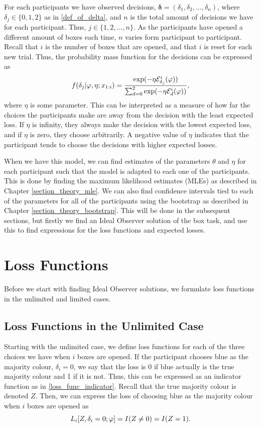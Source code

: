 For each participants we have observed decisions, $\boldsymbol{\delta}=(\delta_1,\delta_2,...,\delta_n)$, where $\delta_j \in \{0,1,2 \}$ as in \eqref{def_of_delta}, and $n$ is the total amount of decisions we have for each participant. Thus, $j\in \{1,2,...,n \}$. As the participants have opened a different amount of boxes each time, $n$ varies form participant to participant. Recall that $i$ is the number of boxes that are opened, and that $i$ is reset for each new trial. Thus, the probability mass function for the decisions can be expressed as
\begin{equation}
\label{softmax_theta}
    f(\delta_{j}|\varphi,\eta;x_{1:i}) = \frac{\text{exp}(- \eta \mathcal{E}^i_{\delta_{j}}(\varphi))}{\sum_{d=0}^{2} \text{exp}(-\eta \mathcal{E}^i_{d}(\varphi))},
\end{equation}
where $\eta$ is some parameter. This can be interpreted as a measure of how far the choices the participants make are away from the decision with the least expected loss. If $\eta$ is infinity, they always make the decision with the lowest expected loss, and if $\eta$ is zero, they choose arbitrarily. A negative value of $\eta$ indicates that the participant tends to choose the decisions with higher expected losses.


When we have this model, we can find estimates of the parameters $\theta$ and $\eta$ for each participant such that the model is adapted to each one of the participants. This is done by finding the maximum likelihood estimates (MLEs) as described in Chapter \ref{section_theory_mle}. 
We can also find confidence intervals tied to each of the parameters for all of the participants using the bootstrap as described in Chapter \ref{section_theory_bootstrap}. This will be done in the subsequent sections, but firstly we find an Ideal Observer solution of the box task, and use this to find expressions for the loss functions and expected losses. 


\section{Loss Functions}
Before we start with finding Ideal Observer solutions, we formulate loss functions in the unlimited and limited cases. 

\subsection{Loss Functions in the Unlimited Case}
Starting with the unlimited case, we define loss functions for each of the three choices we have when $i$ boxes are opened. If the participant chooses blue as the majority colour, $\delta_i=0$, we say that the loss is 0 if blue actually is the true majority colour and 1 if it is not. Thus, this can be expressed as an indicator function as in \eqref{loss_func_indicator}. Recall that the true majority colour is denoted $Z$. Then, we can express the loss of choosing blue as the majority colour when $i$ boxes are opened as
\begin{equation}
\label{loss_func_blue}
    L_i[Z,\delta_i=0;\varphi] = I(Z\neq0) = I(Z=1).
\end{equation}

